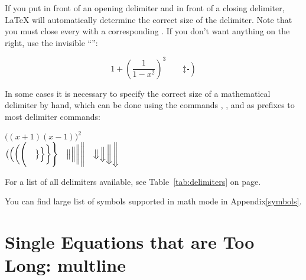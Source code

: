 If you put  in front of an opening delimiter and
 in front of a closing delimiter, \LaTeX{} will automatically
determine the correct size of the delimiter. Note that you must close
every  with a corresponding . If you
don't want anything on the right, use the invisible ``'':
\begin{example}
\begin{equation*}
1 + \left(\frac{1}{1-x^{2}}
    \right)^3 \qquad 
\left. \ddagger \frac{~}{~}\right)
\end{equation*}
\end{example}

In some cases it is necessary to specify the correct size of a
mathematical delimiter by hand,
which can be done using the commands , ,  and
 as prefixes to most delimiter commands:
\begin{chktexignore}
  \begin{example}
$\Big((x+1)(x-1)\Big)^{2}$\\
$\big( \Big( \bigg( \Bigg( \quad
\big\} \Big\} \bigg\} \Bigg\} \quad
\big\| \Big\| \bigg\| \Bigg\| \quad
\big\Downarrow \Big\Downarrow 
\bigg\Downarrow \Bigg\Downarrow$
\end{example}
\end{chktexignore}

For a list of all delimiters available, see Table~\ref{tab:delimiters} on page\pageref{tab:delimiters}.

You can find large list of symbols supported in math mode in
Appendix\ref{symbols}.

\section{Single Equations that are Too Long: multline}%
\label{sec:multline}

